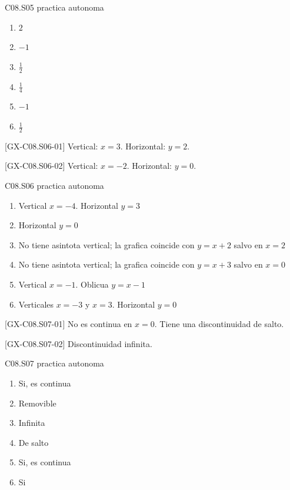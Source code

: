 \begin{shortanswer}{C08.S05 practica autonoma}
\begin{enumerate}[label=\textbf{PX-C08.S05-\arabic*:}, leftmargin=*]
  \item \(2\)
  \item \(-1\)
  \item \(\frac{1}{2}\)
  \item \(\frac{1}{4}\)
  \item \(-1\)
  \item \(\frac{1}{2}\)
\end{enumerate}
\end{shortanswer}

\begin{shortanswer}{[GX-C08.S06-01]}
Vertical: \(x=3\). Horizontal: \(y=2\).
\end{shortanswer}

\begin{shortanswer}{[GX-C08.S06-02]}
Vertical: \(x=-2\). Horizontal: \(y=0\).
\end{shortanswer}

\begin{shortanswer}{C08.S06 practica autonoma}
\begin{enumerate}[label=\textbf{PX-C08.S06-\arabic*:}, leftmargin=*]
  \item Vertical \(x=-4\). Horizontal \(y=3\)
  \item Horizontal \(y=0\)
  \item No tiene asintota vertical; la grafica coincide con \(y=x+2\) salvo en \(x=2\)
  \item No tiene asintota vertical; la grafica coincide con \(y=x+3\) salvo en \(x=0\)
  \item Vertical \(x=-1\). Oblicua \(y=x-1\)
  \item Verticales \(x=-3\) y \(x=3\). Horizontal \(y=0\)
\end{enumerate}
\end{shortanswer}

\begin{shortanswer}{[GX-C08.S07-01]}
No es continua en \(x=0\). Tiene una discontinuidad de salto.
\end{shortanswer}

\begin{shortanswer}{[GX-C08.S07-02]}
Discontinuidad infinita.
\end{shortanswer}

\begin{shortanswer}{C08.S07 practica autonoma}
\begin{enumerate}[label=\textbf{PX-C08.S07-\arabic*:}, leftmargin=*]
  \item Si, es continua
  \item Removible
  \item Infinita
  \item De salto
  \item Si, es continua
  \item Si
\end{enumerate}
\end{shortanswer}

